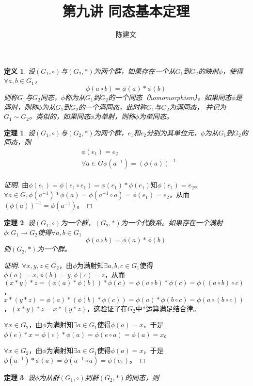 \documentclass{article}
\newtheorem{Def}{定义}
\newtheorem{Thm}{定理}
\begin{document}
\begin{CJK*}{UTF8}{gbsn}
  \title{第九讲 同态基本定理}
  \author{陈建文}
  \maketitle
  

\begin{Def}
  设$(G_1,\circ)$与$(G_2,*)$为两个群，如果存在一个从$G_1$到$G_2$的映射$\phi$，使得$\forall a,b\in G_1$，\[\phi(a\circ b)=\phi(a)* \phi(b)\]
  则称$G_1$与$G_2$同态，$\phi$称为从$G_1$到$G_2$的一个同态（homomorphism）。如果同态$\phi$是满射，则称$\phi$为从$G_1$到$G_2$的一个满同态，此时称$G_1$与$G_2$为满同态，
  并记为$G_1\sim G_2$。类似的，如果同态$\phi$为单射，则称$\phi$为单同态。
\end{Def}

\begin{Thm}
  设$(G_1,\circ)$与$(G_2,*)$为两个群，$e_1$和$e_2$分别为其单位元，$\phi$为从$G_1$到$G_2$的同态，则
  \begin{align*}
    &\phi(e_1)=e_2\\
    &\forall a\in G \phi(a^{-1})=(\phi(a))^{-1}\\
  \end{align*}
\end{Thm}
\begin{proof}[证明]
  由$\phi(e_1)=\phi(e_1\circ e_1)=\phi(e_1)*\phi(e_1)$知$\phi(e_1)=e_2$。
  $\forall a\in G, \phi(a^{-1})*\phi(a)=\phi(a^{-1}\circ a)=\phi(e_1)=e_2$，从而$(\phi(a))^{-1}=\phi(a^{-1})$。
\end{proof}
\begin{Thm}
  设$(G_1,\circ)$为一个群，$(G_2,*)$为一个代数系。如果存在一个满射$\phi:G_1\to G_2$使得$\forall a,b\in G_1$
  \[\phi(a\circ b)=\phi(a) * \phi(b)\]
  则$(G_2,*)$为一个群。
\end{Thm}
\begin{proof}[证明]
  $\forall x,y,z\in G_2$，由$\phi$为满射知$\exists a,b,c\in G_1$使得$\phi(a)=x,\phi(b)=y,\phi(c)=z$，从而
  $(x*y)*z=(\phi(a)*\phi(b))*\phi(c)=\phi(a\circ b)*\phi(c)=\phi((a\circ b)\circ c)$，$x*(y*z)=\phi(a)* (\phi(b)*\phi(c))=\phi(a)*\phi(b\circ c)=\phi(a\circ (b\circ c))$，$(x*y)*z=x*(y*z)$，这验证了在$G_2$中$*$运算满足结合律。

  $\forall x\in G_2$，由$\phi$为满射知$\exists a\in G_1$使得$\phi(a)=x$，于是$\phi(e)*x=\phi(e)*\phi(a)=\phi(e\circ a)=\phi(a)=x$。

  $\forall x\in G_2$，由$\phi$为满射知$\exists a\in G_1$使得$\phi(a)=x$，于是$\phi(a^{-1})*\phi(a)=\phi(a^{-1}\circ a)=\phi(e_1)$。
\end{proof}
\begin{Thm}
  设$\phi$为从群$(G_1,\circ)$到群$(G_2,*)$的同态，则


\end{Thm}
\end{CJK*}
\end{document}

